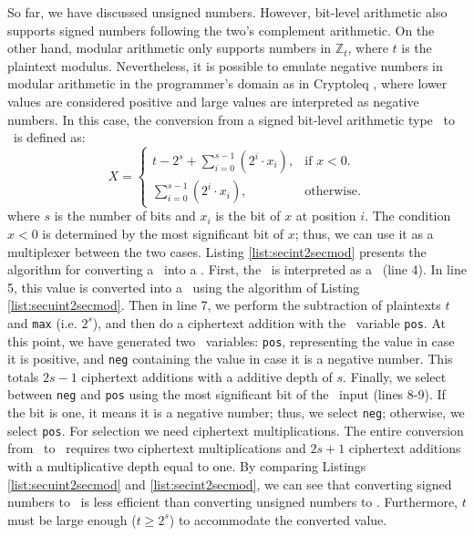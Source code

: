 So far, we have discussed unsigned numbers. However, bit-level arithmetic also supports signed numbers following the two's complement arithmetic.
On the other hand, modular arithmetic only supports numbers in $\mathbb{Z}_t$, where $t$ is the plaintext modulus.
Nevertheless, it is possible to emulate negative numbers in modular arithmetic in the programmer's domain as in Cryptoleq \cite{cryptoleq}, where lower values are considered positive and large values are interpreted as negative numbers.
In this case, the conversion from a signed bit-level arithmetic type \secint\ to \secmod\ is defined as:
\begin{equation}
  X=\begin{cases}
    t - 2^s + \sum_{i=0}^{s-1}{(2^i \cdot x_i)}, & \text{if $x<0$}.\\
    \sum_{i=0}^{s-1}{(2^i \cdot x_i)}, & \text{otherwise}.
  \end{cases}
\end{equation}
where $s$ is the number of bits and $x_i$ is the bit of $x$ at position $i$. The condition $x < 0$ is determined by the most significant bit of $x$; thus, we can use it as a multiplexer between the two cases.
Listing \ref{list:secint2secmod} presents the algorithm for converting a \secint\ into a \secmod. First, the \secint\ is interpreted as a \secuint\ (line 4). In line 5, this value is converted into a \secmod\ using the algorithm of Listing \ref{list:secuint2secmod}.
Then in line 7, we perform the subtraction of plaintexts $t$ and \texttt{max} (i.e. $2^s$), and then do a ciphertext addition with the \secmod\ variable \texttt{pos}. At this point, we have generated two \secmod\ variables: \texttt{pos}, representing the value in case it is positive, and \texttt{neg} containing the value in case it is a negative number. This totals $2s - 1$ ciphertext additions with a additive depth of $s$.
Finally, we select between \texttt{neg} and \texttt{pos} using the most significant bit of the \secint\ input (lines 8-9). If the bit is one, it means it is a negative number; thus, we select \texttt{neg}; otherwise, we select \texttt{pos}.
For selection we need ciphertext multiplications.
The entire conversion from \secint\ to \secmod\ requires two ciphertext multiplications and $2s + 1$ ciphertext additions with a multiplicative depth equal to one.
By comparing Listings \ref{list:secuint2secmod} and \ref{list:secint2secmod}, we can see that converting signed numbers to \secmod\ is less efficient than converting unsigned numbers to \secmod. Furthermore, $t$ must be large enough ($t \geq 2^s$) to accommodate the converted value.

